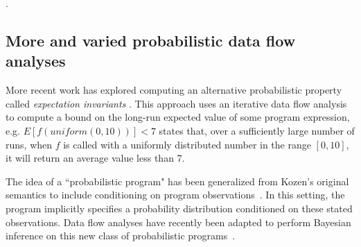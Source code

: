 \cite{PRISMabstraction,wachter2010best,esparza2011probabilistic}.

\subsection{More and varied probabilistic data flow analyses}

More recent work has explored computing an alternative probabilistic
property called {\sl expectation invariants} \cite{chakarov2014expectation}.
This approach uses an iterative data flow analysis to 
compute a bound on the long-run expected value of
some program expression, e.g. $E[f(\mathit{uniform}(0,10))] < 7$ states that,
over a sufficiently large number of runs, when $f$ is called with
a uniformly distributed number in the range $[0,10]$, it will return
an average value less than 7.

The idea of a ``probabilistic program" has been generalized from
Kozen's original semantics to include conditioning on program
observations~\cite{Gordon2014}.
In this setting, the program implicitly specifies a probability 
distribution conditioned on these stated observations.
Data flow analyses have recently been adapted to perform Bayesian
inference on this new class of probabilistic 
programs~\cite{claret2013bayesian}.  
